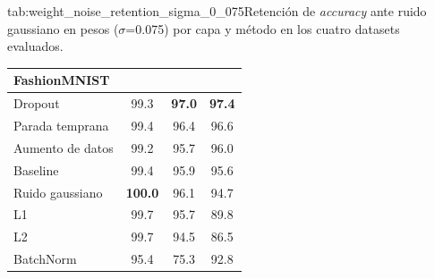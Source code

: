 \begin{table}{tab:weight_noise_retention_sigma_0_075}{Retención de \textit{accuracy} ante ruido gaussiano en pesos ($\sigma$=0.075) por capa y método en los cuatro datasets evaluados.}
\begin{tabular}{lccc}
\multicolumn{4}{l}{\textbf{FashionMNIST}}\\
\midrule
Dropout & 99.3 & \textbf{97.0} & \textbf{97.4} \\
Parada temprana & 99.4 & 96.4 & 96.6 \\
Aumento de datos & 99.2 & 95.7 & 96.0 \\
Baseline & 99.4 & 95.9 & 95.6 \\
Ruido gaussiano & \textbf{100.0} & 96.1 & 94.7 \\
L1 & 99.7 & 95.7 & 89.8 \\
L2 & 99.7 & 94.5 & 86.5 \\
BatchNorm & 95.4 & 75.3 & 92.8 \\
\bottomrule
\end{tabular}
\end{table}